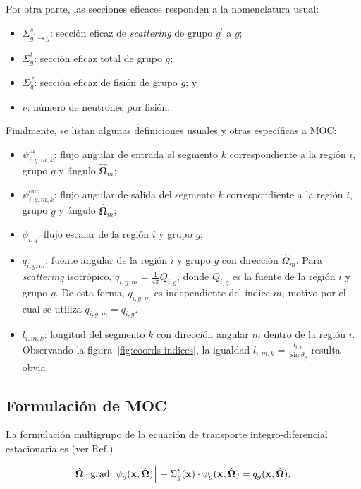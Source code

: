 \documentclass[11pt]{article}
\renewcommand{\vec}[1]{\ensuremath\mathbf{#1}}
\begin{document}
Por otra parte, las secciones eficaces responden a la nomenclatura usual:

\begin{itemize}
\renewcommand\labelitemi{$\cdot$}
 \item $\Sigma^s_{g^\prime \rightarrow g}$: sección eficaz de \emph{scattering} de grupo $g^\prime$ a $g$;
 \item $\Sigma^t_g$: sección eficaz total de grupo $g$;
 \item $\Sigma^f_g$: sección eficaz de fisión de grupo $g$; y
 \item $\nu$: número de neutrones por fisión.
\end{itemize}

Finalmente, se listan algunas definiciones usuales y otras específicas a MOC:

\begin{itemize}
\renewcommand\labelitemi{$\cdot$}
 \item $\psi^{\text{in}}_{i,g,m,k}$: flujo angular de entrada al segmento $k$ correspondiente a la región $i$, grupo $g$ y ángulo $\boldsymbol{\hat{\Omega}}_m$;
 \item $\psi^{\text{out}}_{i,g,m,k}$: flujo angular de salida del segmento $k$ correspondiente a la región $i$, grupo $g$ y ángulo $\boldsymbol{\hat{\Omega}}_m$;
 \item $\phi_{i,g}$: flujo escalar de la región $i$ y grupo $g$;
 \item $q_{i,g,m}$: fuente angular de la región $i$ y grupo $g$ con dirección $\hat{\Omega}_m$. Para \emph{scattering} isotrópico, $q_{i,g,m} = \frac{1}{4\pi}Q_{i,g}$, donde $Q_{i,g}$ es la fuente de la región $i$ y grupo $g$. De esta forma, $q_{i,g,m}$ es independiente del índice $m$, motivo por el cual se utiliza $q_{i,g,m} = q_{i,g}$.
 \item $l_{i,m,k}$: longitud del segmento $k$ con dirección angular $m$ dentro de la región $i$. Observando la figura~\ref{fig:coords-indices}, la igualdad $l_{i,m,k} = \frac{l_{i,k}}{\sin \theta_p}$ resulta obvia.
\end{itemize}

\subsection{Formulación de MOC}

La formulación multigrupo de la ecuación de transporte integro-diferencial estacionaria es (ver Ref.\cite{handbookpag760})

\begin{equation}
 \label{eq:transportemultigrupo}
 \boldsymbol{\hat{\Omega}} \cdot \text{grad} \left[ \psi_g(\vec{x}, \boldsymbol{\hat{\Omega}}) \right]
 + \Sigma^t_g(\vec{x}) \cdot \psi_g(\vec{x}, \boldsymbol{\hat{\Omega}}) = q_g(\vec{x}, \boldsymbol{\hat{\Omega}}),
\end{equation}
\end{document}
